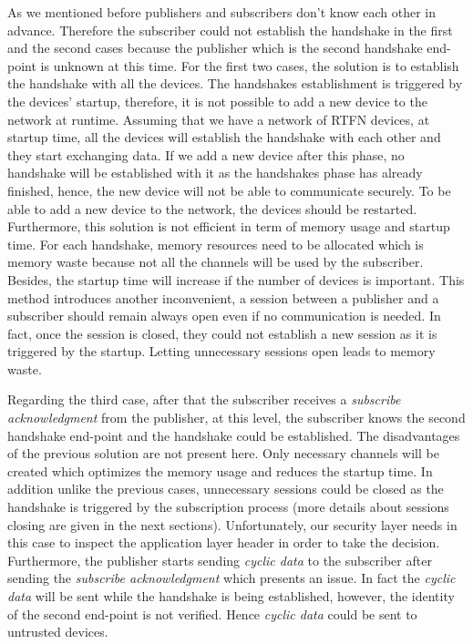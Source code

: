 As we mentioned before publishers and subscribers don't know each other in advance. Therefore
the subscriber could not establish the handshake in the first and the second cases because the publisher
which is the second handshake end-point is unknown at this time. For the first two cases, the solution is to establish
the handshake with all the devices. The handshakes establishment is triggered by the devices' startup, therefore,
it is not possible to add a new device to the network at runtime. Assuming that we have a network of RTFN devices, at startup time,
all the devices will establish the handshake with each other and they start exchanging data. If we add a new device after this phase,
no handshake will be established with it as the handshakes phase has already finished, hence, the new device will not be able
to communicate securely. To be able to add a new device to the network, the devices should be restarted.
Furthermore, this solution is not efficient in term of memory usage and startup time.
For each handshake, memory resources need to be allocated which is memory
waste because not all the channels will be used by the subscriber.
Besides, the startup time will increase if the number of devices is important.
This method introduces another inconvenient, a session between a publisher and a subscriber should remain always open
even if no communication is needed. In fact, once the session is closed, they could not establish a new session
as it is triggered by the startup. Letting unnecessary sessions open leads to memory waste.


Regarding the third case, after that the subscriber receives a \textit{subscribe acknowledgment} from the publisher,
at this level, the subscriber knows the second handshake end-point and the handshake could be established.
The disadvantages of the previous solution are not present here. Only necessary channels will be created
which optimizes the memory usage and reduces the startup time. In addition unlike the previous cases,
unnecessary sessions could be closed as the handshake is triggered by the subscription process (more details about sessions closing are
given in the next sections). Unfortunately, our security layer
needs in this case to inspect the application layer header in order to take the decision.
Furthermore, the publisher starts
sending \textit{cyclic data} to the subscriber after sending the \textit{subscribe acknowledgment} which presents an issue.
In fact the \textit{cyclic data} will be sent while the handshake is being established, however, the
identity of the second end-point is not verified. Hence \textit{cyclic data} could be sent to untrusted devices.

